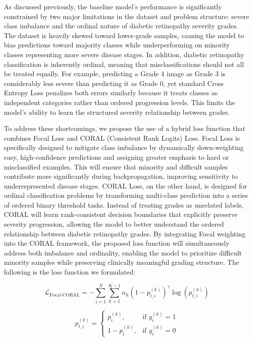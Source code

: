 As discussed previously, the baseline model’s performance is significantly constrained by two major limitations in the dataset 
and problem structure: severe class imbalance and the ordinal nature of diabetic retinopathy severity grades. The dataset is 
heavily skewed toward lower-grade samples, causing the model to bias predictions toward majority classes while underperforming 
on minority classes representing more severe disease stages. In addition, diabetic retinopathy classification is inherently ordinal,
meaning that misclassifications should not all be treated equally. For example, predicting a Grade 4 image as Grade 3 is considerably
less severe than predicting it as Grade 0, yet standard Cross Entropy Loss penalizes both errors similarly because it treats
classes as independent categories rather than ordered progression levels. This limits the model’s ability to learn the structured 
severity relationship between grades.

To address these shortcomings, we propose the use of a hybrid loss function that combines Focal Loss and CORAL 
(Consistent Rank Logits) Loss. Focal Loss is specifically designed to mitigate class imbalance by dynamically down-weighting 
easy, high-confidence predictions and assigning greater emphasis to hard or misclassified examples. This will ensure that
minority and difficult samples contribute more significantly during backpropagation, improving sensitivity to
underrepresented disease stages. CORAL Loss, on the other hand, is designed for ordinal classification problems
by transforming multi-class prediction into a series of ordered binary threshold tasks. Instead of treating grades
as unrelated labels, CORAL will learn rank-consistent decision boundaries that explicitly preserve severity progression,
allowing the model to better understand the ordered relationship between diabetic retinopathy grades. By integrating
Focal weighting into the CORAL framework, the proposed loss function will simultaneously address both imbalance and ordinality,
enabling the model to prioritize difficult minority samples while preserving clinically meaningful grading structure. The 
following is the loss function we formulated:

\[
\mathcal{L}_{\text{Focal-CORAL}} =
- \sum_{i=1}^{N}\sum_{k=1}^{K-1}
\alpha_k (1-p_{t,i}^{(k)})^\gamma \log\left(p_{t,i}^{(k)}\right)
\]

\[
p_{t,i}^{(k)} =
\begin{cases}
p_i^{(k)}, & \text{if } y_i^{(k)} = 1 \\
1 - p_i^{(k)}, & \text{if } y_i^{(k)} = 0
\end{cases}
\]


